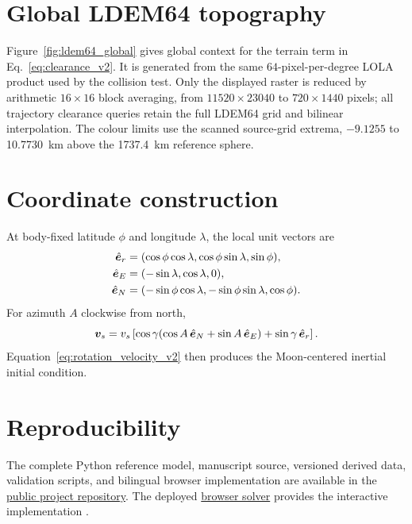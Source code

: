 \section{Global LDEM64 topography}

Figure~\ref{fig:ldem64_global} gives global context for the terrain term in
Eq.~\eqref{eq:clearance_v2}. It is generated from the same \(64\)-pixel-per-degree
LOLA product used by the collision test. Only the displayed raster is reduced
by arithmetic \(16\times16\) block averaging, from
\(11520\times23040\) to \(720\times1440\) pixels; all trajectory clearance
queries retain the full LDEM64 grid and bilinear interpolation. The colour
limits use the scanned source-grid extrema, \(-9.1255\) to
\SI{10.7730}{km} above the \SI{1737.4}{km} reference sphere.



\section{Coordinate construction}

At body-fixed latitude $\phi$ and longitude $\lambda$, the local unit vectors are
\begin{align}
 \hat{\bm{e}}_r&=(\cos\phi\cos\lambda,\cos\phi\sin\lambda,\sin\phi),\\
 \hat{\bm{e}}_E&=(-\sin\lambda,\cos\lambda,0),\\
 \hat{\bm{e}}_N&=(-\sin\phi\cos\lambda,-\sin\phi\sin\lambda,\cos\phi).
\end{align}
For azimuth $A$ clockwise from north,
\begin{equation}
 \bm{v}_s=v_s\left[\cos\gamma(\cos A\,\hat{\bm{e}}_N+\sin A\,\hat{\bm{e}}_E)+\sin\gamma\,\hat{\bm{e}}_r\right].
\end{equation}
Equation~\eqref{eq:rotation_velocity_v2} then produces the Moon-centered inertial initial condition.

\section{Reproducibility}
\label{app:reproducibility}

The complete Python reference model, manuscript source, versioned derived
data, validation scripts, and bilingual browser implementation are available
in the
\href{https://github.com/KimonLu/PHYS1600J-Project-The-Orbital-Home-Run}
{public project repository}. The deployed
\href{https://kimonlu.github.io/PHYS1600J-Project-The-Orbital-Home-Run/}
{browser solver} provides the interactive implementation
\cite{ProjectRepository,WebSolver}.

